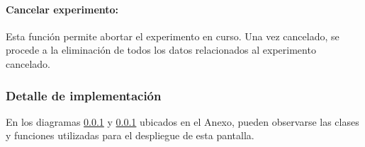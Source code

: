             \paragraph{Cancelar experimento:} 
            Esta función permite abortar el experimento en curso. Una vez cancelado, se procede a la eliminación de todos los datos relacionados al experimento cancelado.
            
            \subsubsection{Detalle de implementación}
            En los diagramas \ref{} y \ref{} ubicados en el Anexo, pueden observarse las clases y funciones utilizadas para el despliegue de esta pantalla.
            
